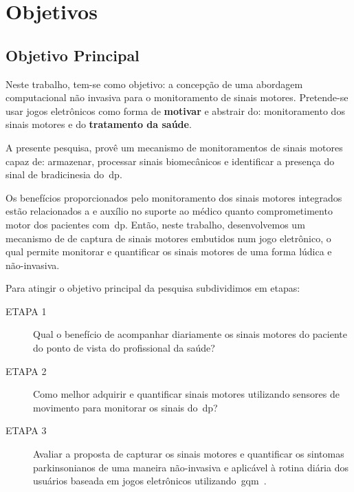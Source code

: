 \section{Objetivos}
\subsection{Objetivo Principal}
Neste trabalho, tem-se como objetivo: a concepção de uma abordagem computacional não invasiva para o monitoramento de sinais motores. Pretende-se usar jogos eletrônicos como forma de \textbf{motivar} e abstrair do: monitoramento dos sinais motores e do \textbf{tratamento da saúde}.


A presente pesquisa, provê um mecanismo de monitoramentos de sinais motores capaz de: armazenar, processar sinais biomecânicos e identificar a presença do sinal de bradicinesia do~\ac{dp}. 




Os benefícios proporcionados pelo monitoramento dos sinais motores integrados estão relacionados a e auxílio no suporte ao médico quanto comprometimento motor dos pacientes com~\ac{dp}. Então, neste trabalho, desenvolvemos um mecanismo de de captura de sinais motores embutidos num jogo eletrônico, o qual permite monitorar e quantificar os sinais motores de uma forma lúdica e não-invasiva.

Para atingir o objetivo principal da pesquisa subdividimos em etapas:
	\begin{description}
	\item[ETAPA 1] Qual o benefício de acompanhar diariamente os sinais motores do paciente do ponto de vista do profissional da saúde?
	\item[ETAPA 2] Como melhor adquirir e quantificar sinais motores utilizando sensores de movimento para monitorar os sinais do~\ac{dp}?
	\item[ETAPA 3] Avaliar a proposta de capturar os sinais motores e quantificar os sintomas parkinsonianos de uma maneira não-invasiva e aplicável à rotina diária dos usuários baseada em jogos eletrônicos utilizando~\ac{gqm}~\cite{van1999goal}.
	\end{description}


